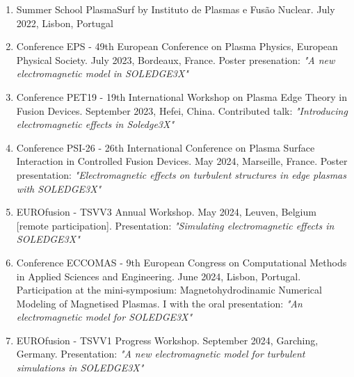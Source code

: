 \begin{enumerate}
\item Summer School PlasmaSurf by Instituto de Plasmas e Fus\~{a}o Nuclear. July 2022, Lisbon, Portugal
\item Conference EPS - 49th European Conference on Plasma Physics, European Physical Society. July 2023, Bordeaux, France. Poster presenation: \textit{"A new electromagnetic model in SOLEDGE3X"}
\item Conference PET19 - 19th International Workshop on Plasma Edge Theory in Fusion Devices. September 2023, Hefei, China. Contributed talk: \textit{"Introducing electromagnetic effects in Soledge3X"}
\item Conference PSI-26 - 26th International Conference on Plasma Surface Interaction in Controlled Fusion Devices. May 2024, Marseille, France. Poster presentation: \textit{"Electromagnetic effects on turbulent structures in edge plasmas with SOLEDGE3X"}
\item EUROfusion - TSVV3 Annual Workshop. May 2024, Leuven, Belgium [remote participation]. Presentation: \textit{"Simulating electromagnetic effects in SOLEDGE3X"}
\item Conference ECCOMAS - 9th European Congress on Computational Methods in Applied Sciences and Engineering. June 2024, Lisbon, Portugal. Participation at the mini-symposium: Magnetohydrodinamic Numerical Modeling of Magnetised Plasmas. I with the oral presentation: \textit{"An electromagnetic model for SOLEDGE3X"}
\item EUROfusion - TSVV1 Progress Workshop. September 2024, Garching, Germany. Presentation: \textit{"A new electromagnetic model for turbulent simulations in SOLEDGE3X"}
\end{enumerate}